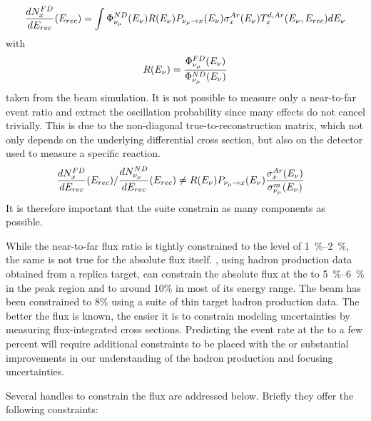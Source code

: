 \begin{align}
\frac{dN^{FD}_{x}}{dE_{rec}}(E_{rec}) & = 
\int \Phi^{ND}_{\nu_\mu}(E_\nu)R(E_\nu)P_{\nu_\mu\rightarrow x}(E_\nu)\sigma^{Ar}_x(E_\nu)T^{d,Ar}_x(E_\nu,E_{rec})dE_\nu\\
\end{align}
with
\begin{align}R(E_\nu) = \frac{\Phi^{FD}_{\nu_\mu}(E_\nu)}{\Phi^{ND}_{\nu_\mu}(E_\nu)}
\end{align}
taken from the beam simulation. 
It is not possible to measure only a near-to-far event ratio and extract the oscillation probability since many effects do not cancel trivially.  This is due to the non-diagonal true-to-reconstruction matrix, which not only depends on the underlying differential cross section, but also on the detector used to measure a specific reaction.
\begin{align}
\frac{dN^{FD}_{x}}{dE_{rec}}(E_{rec})/{\frac{dN^{ND}_{\nu_\mu}}{dE_{rec}}(E_{rec})} & \neq  R(E_\nu)P_{\nu_\mu\rightarrow x}(E_\nu)\frac{\sigma^{Ar}_x(E_\nu)}{\sigma^{m}_{\nu_\mu}(E_\nu)}
\end{align}
It is therefore important that the   suite constrain as many components as possible.


While the near-to-far flux ratio is tightly constrained to the level of \SIrange{1}{2}{\%}, the same is not true for the absolute flux itself. , using hadron production data obtained from a replica target, can constrain the absolute flux at the   to \SIrange{5}{6}{\%} in the peak region and to around 10\% in most of its energy range. The  beam has been constrained to 8\% using a suite of thin target hadron production data. The better the  flux is known, the easier it is to constrain modeling uncertainties by measuring flux-integrated cross sections. Predicting the event rate at the   to a few percent will require additional constraints to be placed with the   or substantial improvements in our understanding of the hadron production and focusing uncertainties. 

Several handles to constrain the flux %
are addressed below. Briefly they offer the following constraints:

